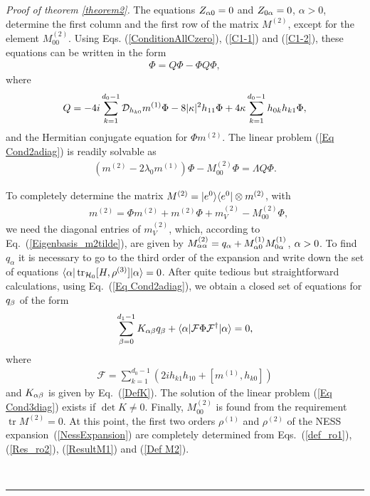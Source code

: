 \documentclass[aps,pra,letterpaper,twocolumn,showpacs,superscriptaddress,floatfix,longbibliography]{revtex4-1}
\newcommand{\tr}{\mathop{\mathrm{tr}}\limits}
\newcommand{\traccazero}{\mathop{\mathrm{tr}_{\mathcal{H}_0}}\limits}
\newenvironment{proof}[1][Proof]{\noindent\textit{#1.} }{\
  \rule{0.5em}{0.5em}}
\begin{document}
\begin{proof}[Proof of theorem \ref{theorem2}]
  The equations $Z_{\alpha 0}=0$ and $Z_{0 \alpha}=0$, $\alpha >0$,
  determine the first column and the first row of the matrix
  $M^{(2)}$, except for the element $M^{(2)}_{00}$.  Using
  Eqs. (\ref{ConditionAllCzero}), (\ref{C1-1}) and (\ref{C1-2}), these
  equations can be written in the form
  \begin{align}
    [h_{00},m^{(2)}- 2 \lambda_0 m^{(1)}]\Phi = Q \Phi- \Phi Q
    \Phi, \label{Eq Cond2adiag}
  \end{align}
  where
  \begin{align}
    Q= - 4 i \sum_{k=1}^{d_0-1} \mathcal{D}_{h_{k0}} m^{(1)} \Phi - 8
    |\kappa|^2 h_{11} \Phi + 4 \kappa \sum_{k=1}^{d_0-1} h_{0k} h_{k1} \Phi,
    \nonumber
  \end{align}
  and the Hermitian conjugate equation for $\Phi m^{(2)}$. The linear
  problem (\ref{Eq Cond2adiag}) is readily solvable as
  \begin{align}
    \left( m^{(2)}- 2 \lambda_0 m^{(1)}\right) \Phi - M^{(2)}_{00}
    \Phi = \Lambda Q \Phi. \label{Res Cond2adiag}
  \end{align}

  To completely determine the matrix $M^{(2)}=|{e^0}\rangle\langle{e^0}|\otimes
  m^{(2)}$, with
  \begin{align}
    &m^{(2)}=\Phi m^{(2)}+ m^{(2)} \Phi + m^{(2)}_V- M^{(2)}_{00}
    \Phi, \label{Def M2}
  \end{align}
  we need the diagonal entries of $m^{(2)}_V$, which, according to
  Eq.~(\ref{Eigenbasis_m2tilde}), are given by $ M^{(2)}_{\alpha \alpha}=
  q_\alpha + M^{(1)}_{\alpha 0} M^{(1)}_{0 \alpha}$, $\alpha>0$.  To find $
  q_\alpha$ it is necessary to go to the third order of the expansion
  and write down the set of equations $\bra{\al} \traccazero [ H,
  \rho^{(3)} ] \ket{\al}=0$.  After quite tedious but straightforward
  calculations, using Eq.~(\ref{Eq Cond2adiag}), we obtain a closed
  set of equations for $ q_\beta$ of the form
  \begin{align}
    \sum_{\beta=0}^{d_1-1} K_{\alpha \beta} q_\beta + \langle{\alpha}| \mathcal{F
    }\Phi \mathcal{F }^\dagger |{\alpha}\rangle =0, \label{Eq Cond3diag}
  \end{align}
  where
  \begin{align}
    \mathcal{F } = \sum_{k=1}^{d_0-1}\left( 2 i h_{k1} h_{10} + [
      m^{(1)},h_{k0} ] \right) \nonumber
  \end{align}
  and $K_{\alpha \beta}$ is given by Eq.~(\ref{DefK}). The solution of the
  linear problem (\ref{Eq Cond3diag}) exists if $\det K \neq
  0$. Finally, $M^{(2)}_{00}$ is found from the requirement $\tr
  M^{(2)}=0$. At this point, the first two orders $\rho^{(1)}$ and
  $\rho^{(2)}$ of the NESS expansion~(\ref{NessExpansion}) are
  completely determined from Eqs.~(\ref{def_ro1}), (\ref{Res_ro2}),
  (\ref{ResultM1}) and (\ref{Def M2}).


\end{proof}
\end{document}
